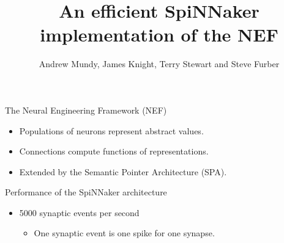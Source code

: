 \documentclass[t]{beamer}
\title{An efficient SpiNNaker implementation of the NEF}
\author{Andrew Mundy, James Knight, Terry Stewart and Steve Furber}
\begin{document}
  \maketitle

  \begin{frame}{The Neural Engineering Framework (NEF)}
    \begin{itemize}
      \item Populations of neurons represent abstract values.
      \item Connections compute functions of representations.
      \item Extended by the Semantic Pointer Architecture (SPA).
    \end{itemize}
  \end{frame}


  \begin{frame}{Performance of the SpiNNaker architecture}
    \begin{itemize}
      \item 5000 synaptic events per second
      \begin{itemize}
        \item One synaptic event is one spike for one synapse.
      \end{itemize}
    \end{itemize}
  \end{frame}





\end{document}
